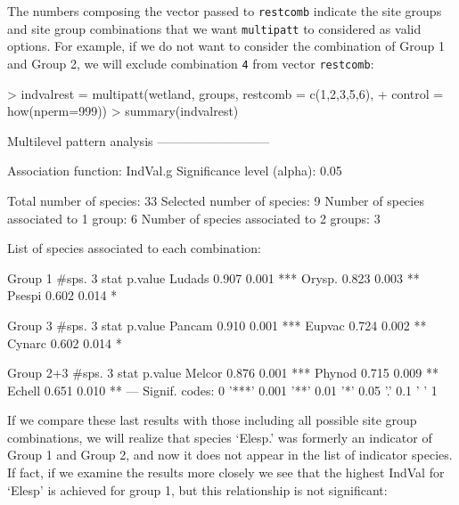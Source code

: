 \documentclass[11pt,a4paper]{article}
\begin{document}
The numbers composing the vector passed to \texttt{restcomb} indicate the site groups and site group combinations that we want \texttt{multipatt} to considered as valid options. For example, if we do not want to consider the combination of Group 1 and Group 2, we will exclude combination \texttt{4} from vector \texttt{restcomb}:
\begin{Schunk}
\begin{Sinput}
> indvalrest = multipatt(wetland, groups, restcomb = c(1,2,3,5,6), 
+                        control = how(nperm=999)) 
> summary(indvalrest)
\end{Sinput}
\begin{Soutput}
 Multilevel pattern analysis
 ---------------------------

 Association function: IndVal.g
 Significance level (alpha): 0.05

 Total number of species: 33
 Selected number of species: 9 
 Number of species associated to 1 group: 6 
 Number of species associated to 2 groups: 3 

 List of species associated to each combination: 

 Group 1  #sps.  3 
        stat p.value    
Ludads 0.907   0.001 ***
Orysp. 0.823   0.003 ** 
Psespi 0.602   0.014 *  

 Group 3  #sps.  3 
        stat p.value    
Pancam 0.910   0.001 ***
Eupvac 0.724   0.002 ** 
Cynarc 0.602   0.014 *  

 Group 2+3  #sps.  3 
        stat p.value    
Melcor 0.876   0.001 ***
Phynod 0.715   0.009 ** 
Echell 0.651   0.010 ** 
---
Signif. codes:  0 '***' 0.001 '**' 0.01 '*' 0.05 '.' 0.1 ' ' 1 
\end{Soutput}
\end{Schunk}
If we compare these last results with those including all possible site group combinations, we will realize that species `Elesp.' was formerly an indicator of Group 1 and Group 2, and now it does not appear in the list of indicator species. If fact, if we examine the results more closely we see that the highest IndVal for `Elesp' is achieved for group 1, but this relationship is not significant:
\end{document}
